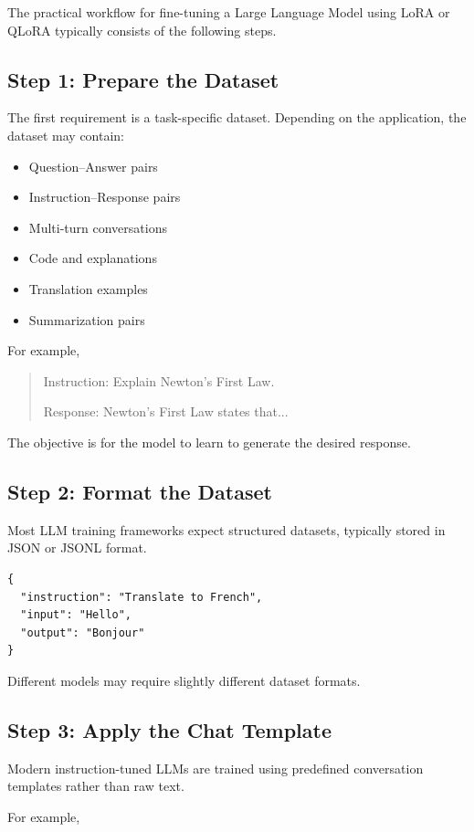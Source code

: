 The practical workflow for fine-tuning a Large Language Model using LoRA or QLoRA typically consists of the following steps.
\subsection*{Step 1: Prepare the Dataset}

The first requirement is a task-specific dataset. Depending on the application, the dataset may contain:

\begin{itemize}
\item Question--Answer pairs
\item Instruction--Response pairs
\item Multi-turn conversations
\item Code and explanations
\item Translation examples
\item Summarization pairs
\end{itemize}

For example,

\begin{quote}
Instruction: Explain Newton's First Law.

Response: Newton's First Law states that...
\end{quote}

The objective is for the model to learn to generate the desired response.
\subsection*{Step 2: Format the Dataset}

Most LLM training frameworks expect structured datasets, typically stored in JSON or JSONL format.

\begin{verbatim}
{
  "instruction": "Translate to French",
  "input": "Hello",
  "output": "Bonjour"
}
\end{verbatim}

Different models may require slightly different dataset formats.
\subsection*{Step 3: Apply the Chat Template}

Modern instruction-tuned LLMs are trained using predefined conversation templates rather than raw text.

For example,

